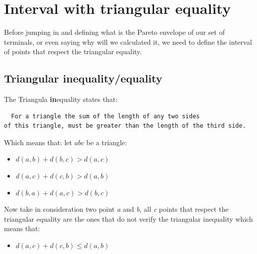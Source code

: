 \chapter{Interval with triangular equality}
Before jumping in and defining what is the Pareto envelope of our set of terminals, or even saying why will we calculated it, we need to define the interval of points that respect the triangular equality.

\section{Triangular inequality/equality} %
\noindent The Triangula \textbf{in}equality states that:
\begin{quoting} \begin{verbatim}
  For a triangle the sum of the length of any two sides
of this triangle, must be greater than the length of the third side.
\end{verbatim} \end{quoting}
Which means that: let $abc$ be a triangle:
\begin{itemize}[noitemsep, nolistsep]
	\item{$d(a,b)+d(b,c) > d(a,c)$}
	\item{$d(a,c)+d(c,b) > d(a,b)$}
	\item{$d(b,a)+d(a,c) > d(b,c)$}
	\newline
\end{itemize}

	Now take in consideration two point \emph{a} and \emph{b}, all \emph{c} points that respect the triangular equality are the ones that do not verify the triangular inequality which means that:
\begin{itemize}[noitemsep, nolistsep]
	\item{$d(a,c)+d(c,b) \leq d(a,b)$}
	\newline
\end{itemize}

